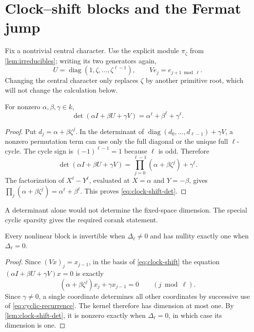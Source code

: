 \section{Clock--shift blocks and the Fermat jump}

Fix a nontrivial central character.  Use the explicit module
$\pi_\zeta$ from \cref{lem:irreducibles}; writing its two generators again,
\begin{equation}\label{eq:clock-shift}
 U=\operatorname{diag}(1,\zeta,\ldots,\zeta^{\ell-1}),
 \qquad Ve_j=e_{j+1\bmod\ell}.
\end{equation}
Changing the central character only replaces $\zeta$ by another primitive
root, which will not change the calculation below.

\begin{lemma}\label{lem:clock-shift-det}
For nonzero $\alpha,\beta,\gamma\in k$,
\begin{equation}\label{eq:clock-shift-det}
 \det(\alpha I+\beta U+\gamma V)
 =\alpha^\ell+\beta^\ell+\gamma^\ell.
\end{equation}
\end{lemma}

\begin{proof}
Put $d_j=\alpha+\beta\zeta^j$.  In the determinant of
$\operatorname{diag}(d_0,\ldots,d_{\ell-1})+\gamma V$, a nonzero permutation
term can use only the full diagonal or the unique full $\ell$-cycle.  The
cycle sign is $(-1)^{\ell-1}=1$ because $\ell$ is odd.  Therefore
\[
 \det(\alpha I+\beta U+\gamma V)
 =\prod_{j=0}^{\ell-1}(\alpha+\beta\zeta^j)+\gamma^\ell.
\]
The factorization of $X^\ell-Y^\ell$, evaluated at
$X=\alpha$ and $Y=-\beta$, gives
$\prod_j(\alpha+\beta\zeta^j)=\alpha^\ell+\beta^\ell$.
This proves \eqref{eq:clock-shift-det}.
\end{proof}

A determinant alone would not determine the fixed-space dimension.  The
special cyclic sparsity gives the required corank statement.

\begin{lemma}\label{lem:nonlinear-nullity}
Every nonlinear block is invertible when $\Delta_\ell\ne0$ and has nullity
exactly one when $\Delta_\ell=0$.
\end{lemma}

\begin{proof}
Since $(Vx)_j=x_{j-1}$, in the basis of \eqref{eq:clock-shift} the equation
$(\alpha I+\beta U+\gamma V)x=0$ is exactly
\begin{equation}\label{eq:cyclic-recurrence}
 (\alpha+\beta\zeta^j)x_j+\gamma x_{j-1}=0
 \qquad(j\bmod\ell).
\end{equation}
Since $\gamma\ne0$, a single coordinate determines all other coordinates by
successive use of \eqref{eq:cyclic-recurrence}.  The kernel therefore has
dimension at most one.  By \cref{lem:clock-shift-det}, it is nonzero exactly
when $\Delta_\ell=0$, in which case its dimension is one.
\end{proof}

